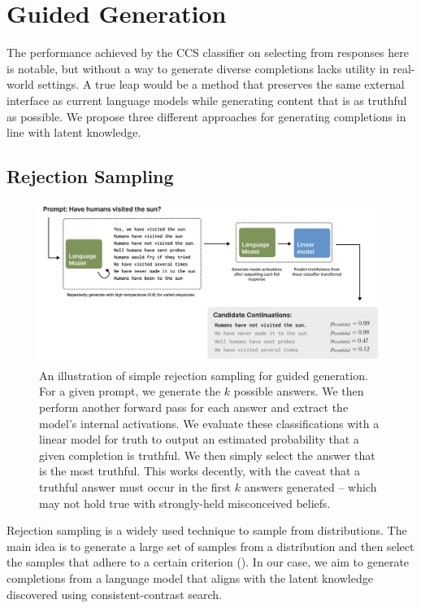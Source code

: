 \documentclass{article}
\begin{document}
\newpage

\section{Guided Generation}

The performance achieved by the CCS classifier on selecting from responses here is notable, but without a way to generate diverse completions lacks utility in real-world settings. A true leap would be a method that preserves the same external interface as current language models while generating content that is as truthful as possible. We propose three different approaches for generating completions in line with latent knowledge.

\subsection{Rejection Sampling}

\begin{figure}[h]
\includegraphics[width=1\textwidth]{rejection}
\caption{An illustration of simple rejection sampling for guided generation. For a given prompt, we generate the $k$ possible answers. We then perform another forward pass for each answer and extract the model's internal activations. We evaluate these classifications with a linear model for truth to output an estimated probability that a given completion is truthful. We then simply select the answer that is the most truthful. This works decently, with the caveat that a truthful answer must occur in the first $k$ answers generated -- which may not hold true with strongly-held misconceived beliefs. }

\label{fig:figure2}
\end{figure}


Rejection sampling is a widely used technique to sample from distributions. The main idea is to generate a large set of samples from a distribution and then select the samples that adhere to a certain criterion (\cite{ghojogh2020sampling}). In our case, we aim to generate completions from a language model that aligns with the latent knowledge discovered using consistent-contrast search.
\end{document}
